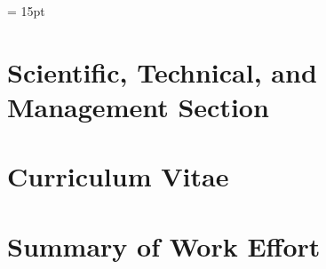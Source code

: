 \documentclass[12pt]{article}
\begin{document}


\setlength{\baselineskip}{1.0\baselineskip} %
\setlength{\parskip}{1.\parskip}

\parindent = 15pt

\tableofcontents

\setcounter{page}{0}
\setcounter{figure}{0}

\newpage

\section{Scientific, Technical, and Management Section}



\vspace{-0.15in}
%


\vspace{-0.22in}




\vspace{-0.22in}



\vspace{-0.22in}



\vspace{-0.22in}



\vspace{-0.22in}



\vspace{-0.22in}



\newpage



\newpage

\section{Curriculum Vitae}
\label{sec:cv}

\newpage
\addtocounter{page}{8}
\section{Summary of Work Effort}
\label{sec:workeffort}
\end{document}
